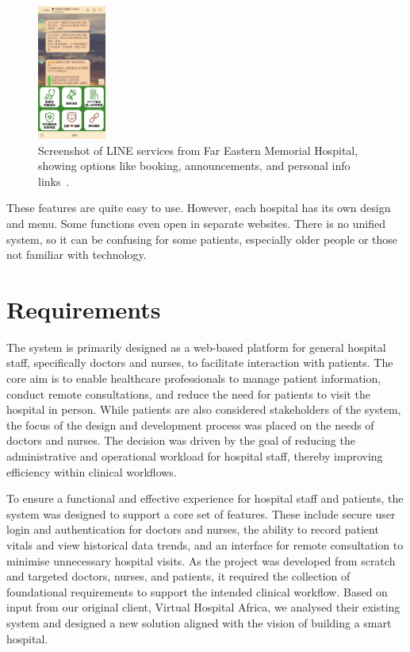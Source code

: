 \noindent
\begin{figure}[htbp]
    \centering
    \includegraphics[width=0.2\textwidth]{../../images/line.jpg}
    \caption{Screenshot of LINE services from Far Eastern Memorial Hospital, showing options like booking, announcements, and personal info links~\cite{femhline}.}
    \label{fig:line-service}
\end{figure}
\noindent

These features are quite easy to use. However, each hospital has its own design and menu. Some functions even open in separate websites. There is no unified system, so it can be confusing for some patients, especially older people or those not familiar with technology.



\clearpage  %


\clearpage
\section{Requirements}
\label{sec:requirements}

The system is primarily designed as a web-based platform for general hospital staff, specifically doctors and nurses, to facilitate interaction with patients. The core aim is to enable healthcare professionals to manage patient information, conduct remote consultations, and reduce the need for patients to visit the hospital in person.
While patients are also considered stakeholders of the system, the focus of the design and development process was placed on the needs of doctors and nurses. The decision was driven by the goal of reducing the administrative and operational workload for hospital staff, thereby improving efficiency within clinical workflows.

To ensure a functional and effective experience for hospital staff and patients, the system was designed to support a core set of features. These include secure user login and authentication for doctors and nurses, the ability to record patient vitals and view historical data trends, and an interface for remote consultation to minimise unnecessary hospital visits.
As the project was developed from scratch and targeted doctors, nurses, and patients, it required the collection of foundational requirements to support the intended clinical workflow. Based on input from our original client, Virtual Hospital Africa, we analysed their existing system and designed a new solution aligned with the vision of building a smart hospital.

